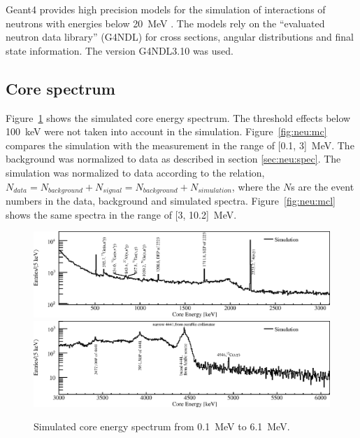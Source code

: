 Geant4 provides high precision models for the simulation of
interactions of neutrons with energies below 20~MeV \cite{Gea03,
Gea06}. The models rely on the ``evaluated neutron data library''
(G4NDL) for cross sections, angular distributions and final state
information. The version G4NDL3.10 was used.

\subsection{Core spectrum}
\label{sec:neu:spemc}
Figure~\ref{fig:neu:mca} shows the simulated core energy spectrum. The
threshold effects below 100~keV were not taken into account in the
simulation. Figure~\ref{fig:neu:mc} compares the simulation with the
measurement in the range of [0.1, 3]~MeV. The background was
normalized to data as described in section \ref{sec:neu:spec}. The
simulation was normalized to data according to the relation, $N_{data}
= N_{background} + N_{signal} = N_{background} + N_{simulation}$,
where the $N$s are the event numbers in the data, background and
simulated spectra. Figure~\ref{fig:neu:mcl} shows the same spectra in
the range of [3, 10.2]~MeV.

\begin{figure}[tbhp]
  \centering
  \includegraphics[width=\textwidth,clip]{spectra_mc1}
  \includegraphics[width=\textwidth,clip]{spectra_mc2}
  \caption{Simulated core energy spectrum from 0.1~MeV to 6.1~MeV.}
  \label{fig:neu:mca}
\end{figure}

